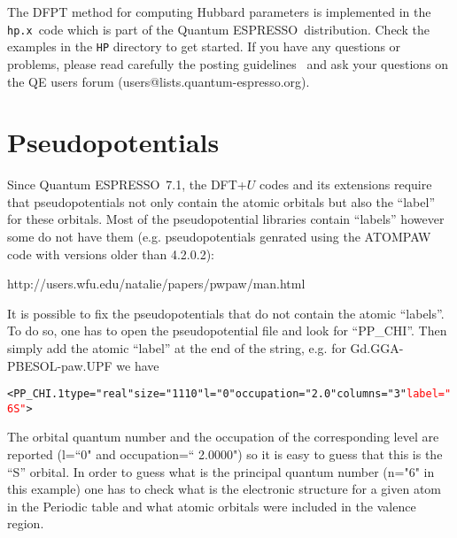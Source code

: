 \documentclass[12pt,a4paper]{article}
\def\version{7.1}
\def\qe{{\sc Quantum ESPRESSO}}
\def\hp{\texttt{hp.x}}
\begin{document}
The DFPT method for computing Hubbard parameters is implemented in the \hp\ code which is part of the \qe\ distribution. Check the examples in the \texttt{HP} directory to get started. If you have any questions or problems, please read carefully the posting guidelines~\cite{QE} and ask your questions on the QE users forum (users@lists.quantum-espresso.org). 


\section{Pseudopotentials}

Since \qe\ \version, the DFT+$U$ codes and its extensions require that pseudopotentials not only contain the atomic orbitals but also the ``label'' for these orbitals. Most of the pseudopotential libraries contain ``labels'' however some do not have them (e.g. pseudopotentials genrated using the ATOMPAW code with versions older than 4.2.0.2):\par 
\noindent
http://users.wfu.edu/natalie/papers/pwpaw/man.html
 
It is possible to fix the pseudopotentials that do not contain the atomic ``labels''. To do so, one has to open the pseudopotential file and look for ``PP\_CHI''. Then simply add the atomic ``label'' at the end of the string, e.g. for Gd.GGA-PBESOL-paw.UPF we have
\noindent
\begin{alltt}
	<PP_CHI.1 type="real" size="1110" l="0" occupation="2.0" columns="3" \textcolor{red}{label="6S"}>
\end{alltt}
The orbital quantum number and the occupation of the corresponding level are reported (l=``0" and occupation=`` 2.0000") so it is easy to guess that this is the ``S'' orbital. In order to guess what is the principal quantum number (n="6" in this example) one has to check what is the electronic structure for a given atom in the Periodic table and what atomic orbitals were included in the valence region. 
\end{document}
